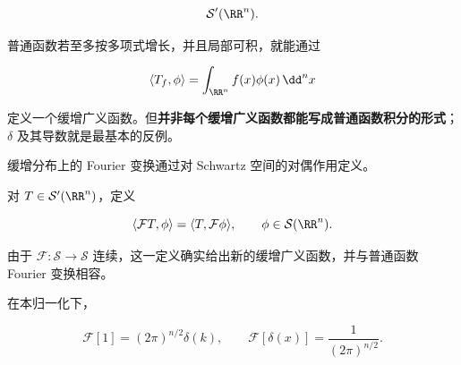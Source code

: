 \[
\mathcal S'(\RR^n).
\]

普通函数若至多按多项式增长，并且局部可积，就能通过

\[
\langle T_f,\phi\rangle
=\int_{\RR^n}f(x)\phi(x)\,\dd^n x
\]

定义一个缓增广义函数。但\textbf{并非每个缓增广义函数都能写成普通函数积分的形式}；$\delta$ 及其导数就是最基本的反例。

缓增分布上的 Fourier 变换通过对 Schwartz 空间的对偶作用定义。

对 $T\in\mathcal S'(\RR^n)$，定义

\[
{\langle\mathcal F T,\phi\rangle
=\langle T,\mathcal F\phi\rangle},
\qquad \phi\in\mathcal S(\RR^n).
\]

由于 $\mathcal F:\mathcal S\to\mathcal S$ 连续，这一定义确实给出新的缓增广义函数，并与普通函数 Fourier 变换相容。

在本归一化下，

\[
\mathcal F[1]=(2\pi)^{n/2}\delta(k),
\qquad
\mathcal F[\delta(x)]=\frac1{(2\pi)^{n/2}}.
\]

